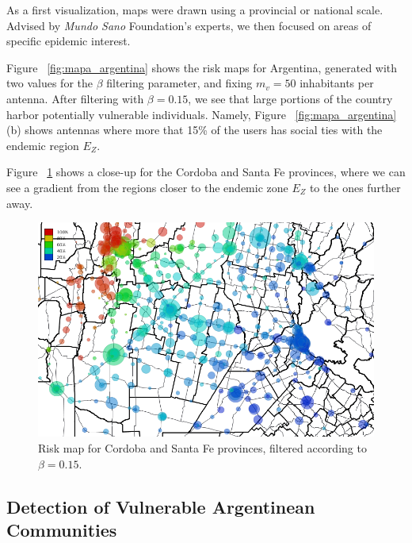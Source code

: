 As a first visualization, maps were drawn using a provincial or national scale.
Advised by \textit{Mundo Sano} Foundation's experts, we then focused on areas of specific epidemic interest.

Figure~ \cref{fig:mapa_argentina} shows the risk maps for Argentina, generated with
two values for the $\beta$ filtering parameter, and fixing $m_v = 50$ inhabitants per antenna. After filtering with $\beta = 0.15$, we see that large portions of the country harbor potentially vulnerable individuals.
Namely, Figure~ \cref{fig:mapa_argentina}(b) shows antennas where more that 15\% of the users has social ties with the endemic region $E_Z$.

Figure~ \cref{fig:cba_sfe} shows a close-up for the Cordoba and Santa Fe provinces,
where we can see a gradient from the regions closer to the endemic zone $E_Z$ to the ones further away.

\begin{figure}[p]
	\centering
	\includegraphics[width=0.95\linewidth]
	{figures/201112_hi_res_cba_sfe_usuarios_proporcion_circulos_beta15/201112_hi_res_cba_sfe_usuarios_proporcion_circulos_beta15}
	\caption{Risk map for Cordoba and Santa Fe provinces, filtered according to $\beta = 0.15$.}
	\label{fig:cba_sfe}
\end{figure}



\subsection{Detection of Vulnerable Argentinean Communities}

